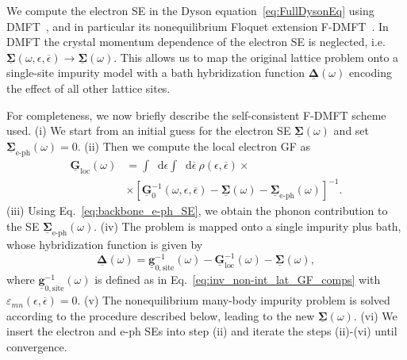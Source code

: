 \documentclass[aps,prb,groupedaddress,showpacs,twocolumn,superscriptaddress,10pt]{revtex4-2}
\newcommand*\dd{\mathop{}\!\mathrm{d}}
\newcommand{\mat}[1]{\bm{#1}} %
\newcommand{\kel}[1]{\underline{#1}} %
\begin{document}
We compute the electron SE in the Dyson equation~\eqref{eq:FullDysonEq} using DMFT~\cite{me.vo.89,ge.ko.92,ge.ko.96}, and in particular its nonequilibrium Floquet extension F-DMFT~\cite{ts.ok.08,sc.mo.02u,jo.fr.08}. In DMFT the crystal momentum dependence of the electron SE is neglected, i.e. $\kel{\mat{\Sigma}}(\omega,\epsilon,\overline{\epsilon}) \to \kel{\mat{\Sigma}}(\omega)$. This allows us to map the original lattice problem onto a single-site impurity model with a bath hybridization function $\kel{\mat\Delta}(\omega)$ encoding the effect of all other lattice sites. 

For completeness, we now
 briefly describe the self-consistent F-DMFT scheme used.
(i) We start from an initial guess for the electron SE $\kel{\mat{\Sigma}}(\omega)$ and set $\kel{\mat \Sigma}_{\text{e-ph}}(\omega)=0$. (ii) Then we compute the local electron GF as 
%  
\begin{equation}\label{eq:Lat_LocGF}
\begin{split}
\kel{\mat G}_{\text{loc}}(\omega) &= \int \dd\epsilon \int \dd\overline{\epsilon} \ \rho(\epsilon,\overline{\epsilon}) \times \\ 
&\times \left[\kel{\mat G}^{-1}_{0}(\omega,\epsilon,\overline{\epsilon}) - \kel{\mat\Sigma}(\omega) - \kel{\mat \Sigma}_{\text{e-ph}}(\omega) \right]^{-1}.
\end{split}
\end{equation}
% 
(iii) Using Eq.~\eqref{eq:backbone_e-ph_SE}, we obtain the phonon contribution to the SE $\kel{\mat{\Sigma}}_{\text{e-ph}}(\omega)$.
(iv) The problem is mapped onto a single impurity plus bath, whose hybridization function
is given by
%
\begin{equation}\label{eq:imp_Dyson_eq}
\kel{\mat{\Delta}}(\omega) = \kel{\mat{g}}^{-1}_{0,\text{site}}(\omega) - \kel{\mat{G}}^{-1}_{\text{loc}}(\omega) - \kel{\mat{\Sigma}}(\omega),
\end{equation}   
%  
where $\kel{\mat{g}}^{-1}_{0,\text{site}}(\omega)$ is defined as in Eq.~\eqref{eq:inv_non-int_lat_GF_comps} with $\varepsilon_{mn}(\epsilon,\overline{\epsilon})=0$. (v) The nonequilibrium many-body impurity problem is solved according to the procedure described below, leading to the new $\kel{\mat{\Sigma}}(\omega)$. (vi) We insert the electron and e-ph SEs into step (ii) and iterate the steps (ii)-(vi) until convergence.

\end{document}
